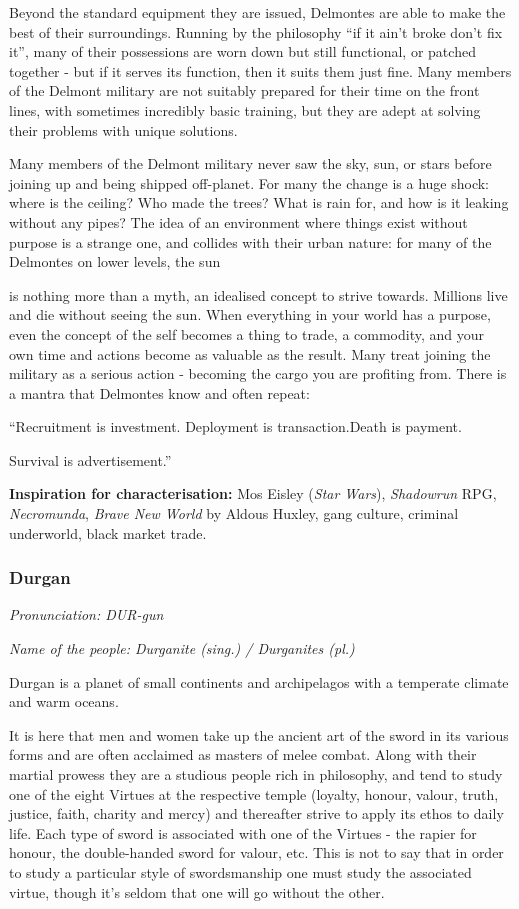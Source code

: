 Beyond the standard equipment they are issued, Delmontes are able to make the best of their surroundings. Running by the philosophy ``if it ain't broke don't fix it'', many of their possessions are worn down but still functional, or patched together - but if it serves its function, then it suits them just fine. Many members of the Delmont military are not suitably prepared for their time on the front lines, with sometimes incredibly basic training, but they are adept at solving their problems with unique solutions.

Many members of the Delmont military never saw the sky, sun, or stars before joining up and being shipped off-planet. For many the change is a huge shock: where is the ceiling? Who made the trees? What is rain for, and how is it leaking without any pipes? The idea of an environment where things exist without purpose is a strange one, and collides with their urban nature: for many of the Delmontes on lower levels, the sun

is nothing more than a myth, an idealised concept to strive towards. Millions live and die without seeing the sun. When everything in your world has a purpose, even the concept of the self becomes a thing to trade, a commodity, and your own time and actions become as valuable as the result. Many treat joining the military as a serious action - becoming the cargo you are profiting from. There is a mantra that Delmontes know and often repeat:

``Recruitment is investment. Deployment is transaction.Death is payment.

Survival is advertisement.''

\textbf{Inspiration for characterisation:} Mos Eisley (\textit{Star Wars}), \textit{Shadowrun} RPG, \textit{Necromunda}, \textit{Brave New World} by Aldous Huxley, gang culture, criminal underworld, black market trade.

\subsubsection{Durgan}

\textit{Pronunciation: DUR-gun}

\textit{Name of the people: Durganite (sing.) / Durganites (pl.)}

Durgan is a planet of small continents and archipelagos with a temperate climate and warm oceans.

It is here that men and women take up the ancient art of the sword in its various forms and are often acclaimed as masters of melee combat. Along with their martial prowess they are a studious people rich in philosophy, and tend to study one of the eight Virtues at the respective temple (loyalty, honour, valour, truth, justice, faith, charity and mercy) and thereafter strive to apply its ethos to daily life. Each type of sword is associated with one of the Virtues - the rapier for honour, the double-handed sword for valour, etc. This is not to say that in order to study a particular style of swordsmanship one must study the associated virtue, though it's seldom that one will go without the other.

